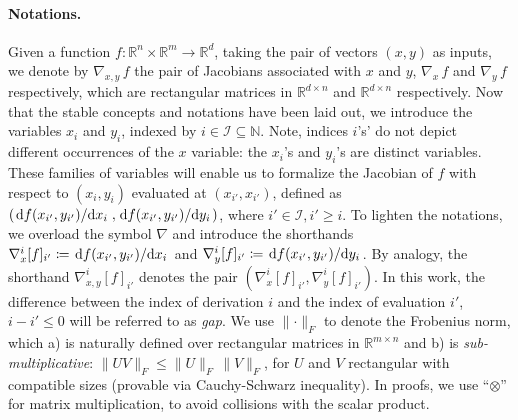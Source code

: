 \paragraph{Notations.}
Given a function
$f: \mathbb{R}^n \times \mathbb{R}^m \rightarrow \mathbb{R}^d$,
taking the pair of vectors $(x, y)$ as inputs, we denote by
$\nabla _{x, y} \, f$ the pair of Jacobians associated with $x$ and $y$,
$\nabla _x \, f$ and $\nabla _y \, f$ respectively,
which are rectangular matrices in
$\mathbb{R}^{d \times n}$ and $\mathbb{R}^{d \times n}$ respectively.
Now that the stable concepts and notations have been laid out,
we introduce the variables $x_i$ and $y_i$,
indexed by $i \in \mathcal{I} \subseteq \mathbb{N}$.
Note, indices $i$'s' do not depict different occurrences of the $x$ variable: the
$x_i$'s and $y_i$'s are distinct variables.
These families of variables will enable us to formalize
the Jacobian of $f$ with respect to $(x_i, y_i)$ evaluated at $(x_{i'}, x_{i'})$,
defined as $(\dv*{f (x_{i'}, y_{i'})}{x_i}, \dv*{f (x_{i'}, y_{i'})}{y_i})$,
where $i' \in \mathcal{I}, i' \geq i$.
To lighten the notations, we overload the symbol $\nabla$ and introduce the shorthands
$\nabla_x^i[f]_{i'} \coloneqq \dv*{f (x_{i'}, y_{i'})}{x_i}$ and
$\nabla_y^i[f]_{i'} \coloneqq \dv*{f (x_{i'}, y_{i'})}{y_i}$.
By analogy, the shorthand $\nabla_{x,y}^i[f]_{i'}$ denotes the pair
$(\nabla_x^i[f]_{i'}, \nabla_y^i[f]_{i'})$.
In this work, the difference between the index of derivation $i$
and the index of evaluation $i'$, $i - i' \leq 0$ will be referred to
as \emph{gap}.
We use $\lVert \cdot \rVert _F$ to denote the Frobenius norm, which
a) is naturally defined over rectangular matrices in $\mathbb{R}^{m \times n}$
and b) is \textit{sub-multiplicative}:
$\lVert UV \rVert _F \leq \lVert U \rVert _F \, \lVert V \rVert _F$,
for $U$ and $V$ rectangular with compatible sizes
(provable via Cauchy-Schwarz inequality).
In proofs, we use ``$\otimes$'' for matrix multiplication,
to avoid collisions with the scalar product.

